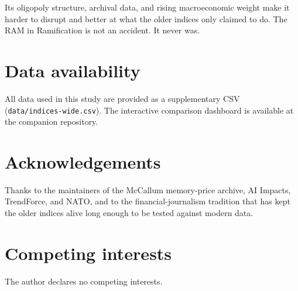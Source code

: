 \documentclass[11pt,a4paper]{article}
\begin{document}
Its oligopoly structure, archival data, and rising macroeconomic weight make it harder to disrupt and better at what the older indices only claimed to do. The RAM in Ramification is not an accident. It never was.

\section*{Data availability}
All data used in this study are provided as a supplementary CSV (\verb|data/indices-wide.csv|). The interactive comparison dashboard is available at the companion repository.

\section*{Acknowledgements}
Thanks to the maintainers of the McCallum memory-price archive, AI Impacts, TrendForce, and NATO, and to the financial-journalism tradition that has kept the older indices alive long enough to be tested against modern data.

\section*{Competing interests}
The author declares no competing interests.



\end{document}
